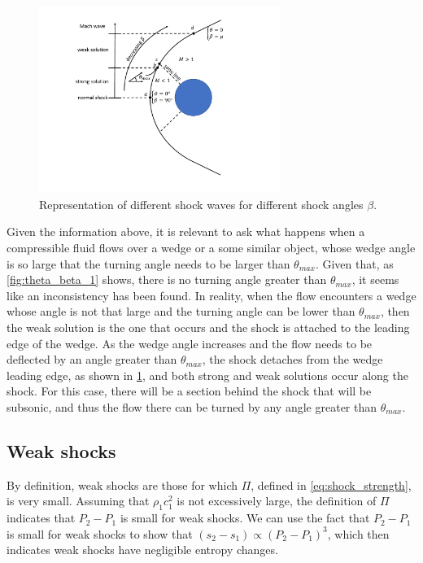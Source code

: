 \documentclass[oneside,a4paper,11pt]{report}
\begin{document}
\begin{figure}[ht]
   \centering
   \includegraphics[width=0.7\textwidth]{../../images/theta_beta_2.pdf}
   \caption{Representation of different shock waves for different shock angles $\beta$.}
   \label{fig:theta_beta_2}
\end{figure}

Given the information above, it is relevant to ask what happens when a compressible fluid flows over a wedge or a some similar object, whose wedge angle is so large that the turning angle needs to be larger than $\theta_{max}$. Given that, as \cref{fig:theta_beta_1} shows, there is no turning angle greater than $\theta_{max}$, it seems like an inconsistency has been found. In reality, when the flow encounters a wedge whose angle is not that large and the turning angle can be lower than $\theta_{max}$, then the weak solution is the one that occurs and the shock is attached to the leading edge of the wedge. As the wedge angle increases and the flow needs to be deflected by an angle greater than $\theta_{max}$, the shock detaches from the wedge leading edge, as shown in \cref{fig:theta_beta_2}, and both strong and weak solutions occur along the shock. For this case, there will be a section behind the shock that will be subsonic, and thus the flow there can be turned by any angle greater than $\theta_{max}$.

\subsection{Weak shocks}
By definition, weak shocks are those for which $\Pi$, defined in \cref{eq:shock_strength}, is very small. Assuming that $\rho_1 c_1^2$ is not excessively large, the definition of $\Pi$ indicates that $P_2 - P_1$ is small for weak shocks. We can use the fact that $P_2 - P_1$ is small for weak shocks to show that $(s_2 - s_1) \propto (P_2-P_1)^3$, which then indicates weak shocks have negligible entropy changes.
\end{document}
